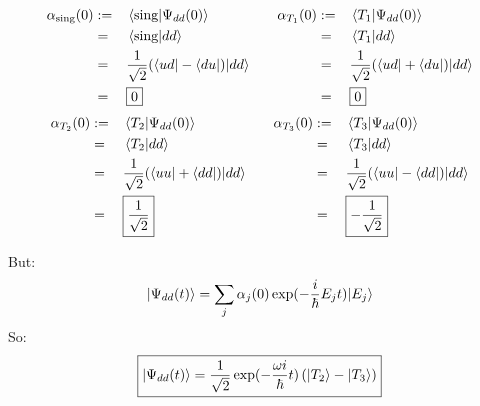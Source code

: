 \documentclass[solutions.tex]{subfiles}
\begin{document}
\begin{equation*}\begin{aligned}
	\alpha_{\text{sing}}(0) &:=&& \left\langle \text{sing} \middle| \Psi_{dd}(0) \right\rangle &&&
	\alpha_{T_1}(0) &:=&& \left\langle T_1 \middle| \Psi_{dd}(0) \right\rangle \\
	~ &=&& \left\langle \text{sing} \middle| dd \right\rangle &&&
	~ &=&& \left\langle T_1 \middle| dd \right\rangle \\
	~ &=&& \frac1{\sqrt2}(\langle ud|-\langle du|)|dd\rangle &&&
	~ &=&& \frac1{\sqrt2}(\langle ud|+\langle du|)|dd\rangle \\
	~ &=&& \boxed{0} &&&
	~ &=&& \boxed{0} \\
\end{aligned}\end{equation*}
\begin{equation*}\begin{aligned}
	\alpha_{T_2}(0) &:=&& \left\langle T_2 \middle| \Psi_{dd}(0) \right\rangle &&&
	\alpha_{T_3}(0) &:=&& \left\langle T_3 \middle| \Psi_{dd}(0) \right\rangle \\
	~ &=&& \left\langle T_2 \middle| dd \right\rangle &&&
	~ &=&& \left\langle T_3 \middle| dd \right\rangle \\
	~ &=&& \frac1{\sqrt2}(\langle uu|+\langle dd|)|dd\rangle &&&
	~ &=&& \frac1{\sqrt2}(\langle uu|-\langle dd|)|dd\rangle \\
	~ &=&& \boxed{\frac1{\sqrt2}} &&&
	~ &=&& \boxed{-\frac1{\sqrt2}} \\
\end{aligned}\end{equation*}

But:
\[
	|\Psi_{dd}(t)\rangle = \sum_j\alpha_j(0)\exp(-\frac{i}\hbar E_jt)|E_j\rangle
\]
So:
\[
	\boxed{
		|\Psi_{dd}(t)\rangle = \frac1{\sqrt2}\exp(-\frac{\omega i}\hbar t)
			\left(|T_2\rangle-|T_3\rangle\right)
	}
\]
\end{document}
